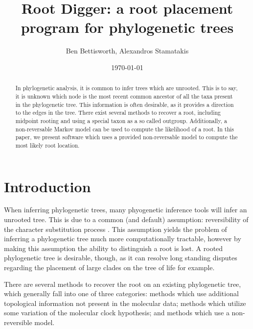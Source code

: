 \documentclass{article}
\title{Root Digger: a root placement program for phylogenetic trees}
\author{Ben Bettisworth, Alexandros Stamatakis}
\date{\today}
\begin{document}
\begin{abstract}
  In phylogenetic analysis, it is common to infer trees which are unrooted.
  This is to say, it is unknown which node is the most recent common ancestor of
  all the taxa present in the phylogenetic tree.
  This information is often desirable, as it provides a direction to the edges in
  the tree.
  There exist several methods to recover a root, including midpoint rooting and
  using a special taxon as a so called outgroup.
  Additionally, a non-reversable Markov model can be used to compute the
  likelihood of a root.
  In this paper, we present software which uses a provided non-reversable model
  to compute the most likely root location.
\end{abstract}

\maketitle


\section{Introduction}


When inferring phylogenetic trees, many phyogenetic inference tools
\cite{stamatakis_raxml_2014} \cite{nguyen_iq-tree:_2015} will infer an unrooted
tree.
This is due to a common (and default) assumption: reversibility of the
character substitution process \cite{felsenstein_evolutionary_1981}.
This assumption yields the problem of inferring a phylogenetic tree much more
computationally tractable, however by making this assumption the ability to
distinguish a root is lost.
A rooted phylogenetic tree is desirable, though, as it can resolve long
standing disputes regarding the placement of large clades on the tree of life
\cite{dunn_animal_2014} for example.

There are several methods to recover the root on an existing phylogenetic tree,
which generally fall into one of three categories: methods which use additional
topological information not present in the molecular data; methods which
utilize some variation of the molecular clock hypothesis; and methods which use
a non-reversible model.
\end{document}
